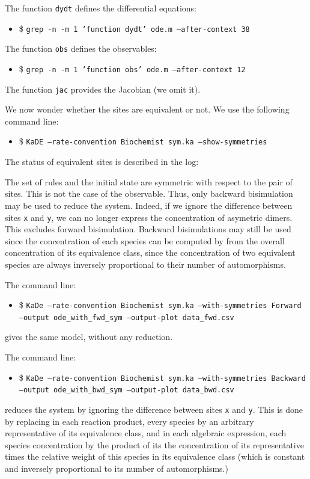 \documentclass[11pt]{book}
\def\ttt#1{\texttt{#1}}
\def\ITE#1{\begin{itemize}#1\end{itemize}}
\begin{document}
The function \texttt{dydt} defines the differential equations:
\ITE{
\item[\$] \ttt{grep -n -m 1 'function dydt' ode.m --after-context 38}}


The function \texttt{obs} defines the observables:
\ITE{
\item[\$] \ttt{grep -n -m 1 'function obs' ode.m --after-context 12}}


The function \texttt{jac} provides the Jacobian (we omit it).

We now wonder whether the sites are equivalent or not. We use the following command line:
\ITE{
\item[\$] \ttt{KaDE --rate-convention Biochemist sym.ka --show-symmetries}}
The status of equivalent sites is described in the log:


The set of rules and the initial state are symmetric with respect to the pair of sites. This is not the case of the observable. Thus, only backward bisimulation may be used to reduce the system. Indeed, if we ignore the difference between sites \texttt{x} and \texttt{y}, we can no longer express the concentration of asymetric dimers. This  excludes forward bisimulation. Backward bisimulations may still be used since the concentration of each species can be computed by from the overall concentration of its equivalence class,  since the concentration of two equivalent species are always inversely proportional to their number of automorphisms.

The command line:
\ITE{
\item[\$] \ttt{KaDe --rate-convention Biochemist sym.ka --with-symmetries Forward --output ode\_with\_fwd\_sym --output-plot data\_fwd.csv}}
gives the same model, without any reduction.

The command line:
\ITE{
\item[\$] \ttt{KaDe --rate-convention Biochemist sym.ka --with-symmetries Backward --output ode\_with\_bwd\_sym --output-plot data\_bwd.csv}}
reduces the system by ignoring the difference between sites \texttt{x} and \texttt{y}. This is done by replacing in each reaction product, every species by an arbitrary representative of its equivalence class, and in each algebraic expression, each species concentration by the product of its the concentration of its representative times the relative weight of this species in its equivalence class (which is constant and inversely proportional to its number of automorphisms.)
\end{document}
